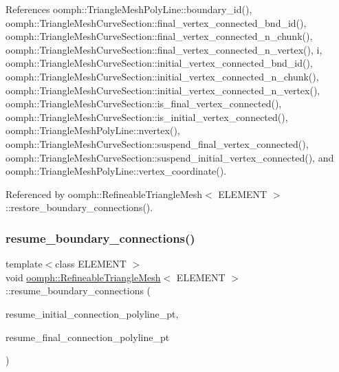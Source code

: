 References oomph\+::\+Triangle\+Mesh\+Poly\+Line\+::boundary\+\_\+id(), oomph\+::\+Triangle\+Mesh\+Curve\+Section\+::final\+\_\+vertex\+\_\+connected\+\_\+bnd\+\_\+id(), oomph\+::\+Triangle\+Mesh\+Curve\+Section\+::final\+\_\+vertex\+\_\+connected\+\_\+n\+\_\+chunk(), oomph\+::\+Triangle\+Mesh\+Curve\+Section\+::final\+\_\+vertex\+\_\+connected\+\_\+n\+\_\+vertex(), i, oomph\+::\+Triangle\+Mesh\+Curve\+Section\+::initial\+\_\+vertex\+\_\+connected\+\_\+bnd\+\_\+id(), oomph\+::\+Triangle\+Mesh\+Curve\+Section\+::initial\+\_\+vertex\+\_\+connected\+\_\+n\+\_\+chunk(), oomph\+::\+Triangle\+Mesh\+Curve\+Section\+::initial\+\_\+vertex\+\_\+connected\+\_\+n\+\_\+vertex(), oomph\+::\+Triangle\+Mesh\+Curve\+Section\+::is\+\_\+final\+\_\+vertex\+\_\+connected(), oomph\+::\+Triangle\+Mesh\+Curve\+Section\+::is\+\_\+initial\+\_\+vertex\+\_\+connected(), oomph\+::\+Triangle\+Mesh\+Poly\+Line\+::nvertex(), oomph\+::\+Triangle\+Mesh\+Curve\+Section\+::suspend\+\_\+final\+\_\+vertex\+\_\+connected(), oomph\+::\+Triangle\+Mesh\+Curve\+Section\+::suspend\+\_\+initial\+\_\+vertex\+\_\+connected(), and oomph\+::\+Triangle\+Mesh\+Poly\+Line\+::vertex\+\_\+coordinate().



Referenced by oomph\+::\+Refineable\+Triangle\+Mesh$<$ E\+L\+E\+M\+E\+N\+T $>$\+::restore\+\_\+boundary\+\_\+connections().

\mbox{\label{classoomph_1_1RefineableTriangleMesh_a418d6f148c3c62a0e714831dd0d73acf}} 
\subsubsection{\texorpdfstring{resume\+\_\+boundary\+\_\+connections()}{resume\_boundary\_connections()}}
{\footnotesize\ttfamily template$<$class E\+L\+E\+M\+E\+NT $>$ \\
void \hyperlink{classoomph_1_1RefineableTriangleMesh}{oomph\+::\+Refineable\+Triangle\+Mesh}$<$ E\+L\+E\+M\+E\+NT $>$\+::resume\+\_\+boundary\+\_\+connections (\begin{DoxyParamCaption}\item[{\hyperlink{classoomph_1_1Vector}{Vector}$<$ \hyperlink{classoomph_1_1TriangleMeshPolyLine}{Triangle\+Mesh\+Poly\+Line} $\ast$$>$ \&}]{resume\+\_\+initial\+\_\+connection\+\_\+polyline\+\_\+pt,  }\item[{\hyperlink{classoomph_1_1Vector}{Vector}$<$ \hyperlink{classoomph_1_1TriangleMeshPolyLine}{Triangle\+Mesh\+Poly\+Line} $\ast$$>$ \&}]{resume\+\_\+final\+\_\+connection\+\_\+polyline\+\_\+pt }\end{DoxyParamCaption})\hspace{0.3cm}{\ttfamily [protected]}}



